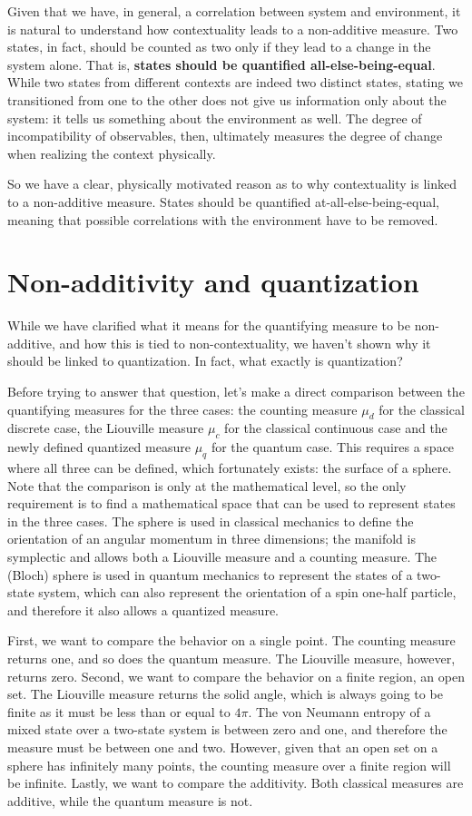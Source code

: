 \documentclass[entropy,article,submit,pdftex,moreauthors]{Definitions/mdpi}
\begin{document}
Given that we have, in general, a correlation between system and environment, it is natural to understand how contextuality leads to a non-additive measure. Two states, in fact, should be counted as two only if they lead to a change in the system alone. That is, \textbf{states should be quantified all-else-being-equal}. While two states from different contexts are indeed two distinct states, stating we transitioned from one to the other does not give us information only about the system: it tells us something about the environment as well. The degree of incompatibility of observables, then, ultimately measures the degree of change when realizing the context physically.

So we have a clear, physically motivated reason as to why contextuality is linked to a non-additive measure. States should be quantified at-all-else-being-equal, meaning that possible correlations with the environment have to be removed.

\section{Non-additivity and quantization}

While we have clarified what it means for the quantifying measure to be non-additive, and how this is tied to non-contextuality, we haven't shown why it should be linked to quantization. In fact, what exactly is quantization?

Before trying to answer that question, let's make a direct comparison between the quantifying measures for the three cases: the counting measure $\mu_d$ for the classical discrete case, the Liouville measure $\mu_c$ for the classical continuous case and the newly defined quantized measure $\mu_q$ for the quantum case. This requires a space where all three can be defined, which fortunately exists: the surface of a sphere. Note that the comparison is only at the mathematical level, so the only requirement is to find a mathematical space that can be used to represent states in the three cases. The sphere is used in classical mechanics to define the orientation of an angular momentum in three dimensions; the manifold is symplectic and allows both a Liouville measure and a counting measure. The (Bloch) sphere is used in quantum mechanics to represent the states of a two-state system, which can also represent the orientation of a spin one-half particle, and therefore it also allows a quantized measure.

First, we want to compare the behavior on a single point. The counting measure returns one, and so does the quantum measure. The Liouville measure, however, returns zero. Second, we want to compare the behavior on a finite region, an open set. The Liouville measure returns the solid angle, which is always going to be finite as it must be less than or equal to $4\pi$. The von Neumann entropy of a mixed state over a two-state system is between zero and one, and therefore the measure must be between one and two. However, given that an open set on a sphere has infinitely many points, the counting measure over a finite region will be infinite. Lastly, we want to compare the additivity. Both classical measures are additive, while the quantum measure is not.
\end{document}
